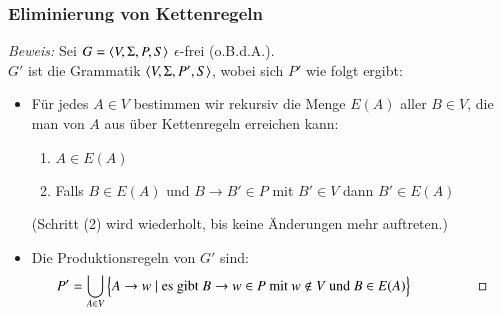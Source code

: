 \documentclass[aspectratio=1610,onlymath]{beamer}
\begin{document}
\begin{frame}\frametitle{Eliminierung von Kettenregeln}

\bigskip
\pause

\pause

\emph{Beweis:} Sei $G=\langle{V,\Sigma,P,S}\rangle$ $\epsilon$-frei (o.B.d.A.).\\$G'$ ist die Grammatik $\langle{V,\Sigma,P',S}\rangle$, wobei sich $P'$ wie folgt ergibt: %

\begin{itemize}
\item Für jedes $A\in V$ bestimmen wir rekursiv die Menge $E(A)$ aller $B\in V$, die man von $A$ aus über Kettenregeln erreichen kann:
\begin{enumerate}[(1)]
\item $A\in E(A)$
\item Falls $B\in E(A)$ und $B\to B'\in P$ mit $B'\in V$ dann $B'\in E(A)$
\end{enumerate}
{\footnotesize(Schritt (2) wird wiederholt, bis keine Änderungen mehr auftreten.)}
\item Die Produktionsregeln von $G'$ sind:
 \[P' = \bigcup_{A\in V}\Big\{ A\to w\mid \text{es gibt }B\to w\in P\text{ mit }w\notin V\text{ und }B\in E(A)\Big\}\hspace{1cm}\qed\]
\end{itemize}


\end{frame}
\end{document}
